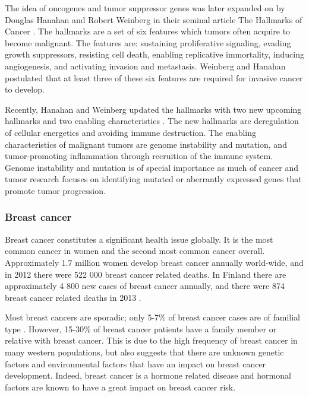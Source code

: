 The idea of oncogenes and tumor suppressor genes was later expanded on by
Douglas Hanahan and Robert Weinberg in their seminal article The Hallmarks of
Cancer \citep{Hanahan2000}. The hallmarks are a set of six features which
tumors often acquire to become malignant. The features are: sustaining
proliferative signaling, evading growth suppressors, resisting cell death,
enabling replicative immortality, inducing angiogenesis, and activating
invasion and metastasis. Weinberg and Hanahan postulated that at least three
of these six features are required for invasive cancer to develop.

Recently, Hanahan and Weinberg updated the hallmarks with two new upcoming
hallmarks and two enabling characteristics \citep{Hanahan2011}. The new
hallmarks are deregulation of cellular energetics and avoiding immune
destruction. The enabling characteristics of malignant tumors are genome
instability and mutation, and tumor-promoting inflammation through recruition
of the immune system. Genome instability and mutation is of special importance
as much of cancer and tumor research focuses  on identifying mutated or
aberrantly expressed genes that promote tumor progression.



\subsubsection{Breast cancer}\label{breast-cancer}

Breast cancer constitutes a significant health issue globally. It is the most
common cancer in women and the second most common cancer overall.
Approximately 1.7 million women develop breast cancer annually world-wide, and
in 2012 there were 522 000 breast cancer related deaths.
\citep{Ferlay2015} In Finland there are approximately 4 800 new cases of
breast cancer annually, and there were 874 breast cancer related deaths in
2013 \citep{Syoparekisteri}.

Most breast cancers are sporadic; only 5-7\% of breast cancer cases are of
familial type \citep{Melchor2013}. However, 15-30\% of breast cancer patients
have a family member or relative with breast cancer. This is due to the high
frequency of breast cancer in many western populations, but also suggests that
there are unknown genetic factors and environmental factors that have an
impact on breast cancer development.  Indeed, breast cancer is a hormone
related disease and hormonal factors are known to have a great impact on
breast cancer risk.


